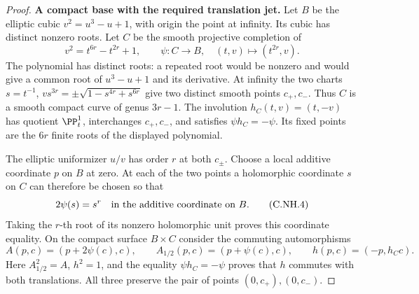 \begin{proof}
\par\medskip\noindent\textbf{A compact base with the required translation jet.}
Let $B$ be the elliptic cubic $v^2=u^3-u+1$, with origin the
point at infinity. Its cubic has distinct nonzero roots. Let
$C$ be the smooth projective completion of
\[
 v^2=t^{6r}-t^{2r}+1,
 \qquad \psi:C\longrightarrow B,\quad
          (t,v)\longmapsto(t^{2r},v).
                                                        \tag{C.NH.3}\label{cdp:eq:C.NH.3}
\]
The polynomial has distinct roots: a repeated root would be
nonzero and would give a common root of $u^3-u+1$ and its
derivative. At infinity the two charts
$s=t^{-1}$, $v s^{3r}=\pm\sqrt{1-s^{4r}+s^{6r}}$ give two
distinct smooth points $c_+,c_-$. Thus $C$ is a smooth compact
curve of genus $3r-1$. The involution $h_C(t,v)=(t,-v)$ has
quotient $\PP^1_t$, interchanges $c_+,c_-$, and satisfies
$\psi h_C=-\psi$. Its fixed points are the $6r$ finite roots
of the displayed polynomial.

The elliptic uniformizer $u/v$ has order $r$ at both
$c_\pm$. Choose a local additive coordinate $p$ on $B$ at
zero. At each of the two points a holomorphic coordinate
$s$ on $C$ can therefore be chosen so that
\[
 2\psi(s)=s^r\quad\hbox{in the additive coordinate on }B.
                                                        \tag{C.NH.4}\label{cdp:eq:C.NH.4}
\]
Taking the $r$-th root of its nonzero holomorphic unit proves
this coordinate equality. On the compact surface $B\times C$
consider the commuting automorphisms
\[
 A(p,c)=(p+2\psi(c),c),\qquad
 A_{1/2}(p,c)=(p+\psi(c),c),\qquad
 h(p,c)=(-p,h_Cc).
                                                        \tag{C.NH.5}\label{cdp:eq:C.NH.5}
\]
Here $A_{1/2}^2=A$, $h^2=1$, and the equality
$\psi h_C=-\psi$ proves that $h$ commutes with both
translations. All three preserve the pair of points
$(0,c_+),(0,c_-)$.


\end{proof}
